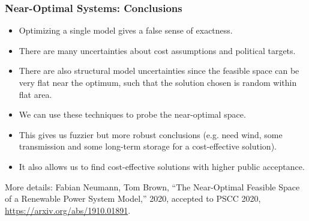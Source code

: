 \documentclass[10pt,aspectratio=169,dvipsnames]{beamer}
\let\olditem\item
\renewcommand{\item}{%
\olditem\vspace{5pt}}
\begin{document}
\begin{frame}
  \frametitle{Near-Optimal Systems: Conclusions}

  \begin{itemize}
  \item Optimizing a single model gives a \alert{false sense of exactness}.
  \item There are many uncertainties about cost assumptions and political targets.
  \item There are also \alert{structural model uncertainties} since the feasible space can be very \alert{flat} near the optimum, such that the solution chosen is random within flat area.
  \item We can use these techniques to probe the \alert{near-optimal space}.
  \item This gives us fuzzier but \alert{more robust} conclusions (e.g. need wind, some transmission and some long-term storage for a cost-effective solution).
    \item It also allows us to find cost-effective solutions with \alert{higher public acceptance}.

  \end{itemize}

  More details: Fabian Neumann, Tom Brown, ``The Near-Optimal Feasible Space of a Renewable Power System Model,'' 2020, accepted to PSCC 2020, \url{https://arxiv.org/abs/1910.01891}.

\end{frame}
\end{document}
